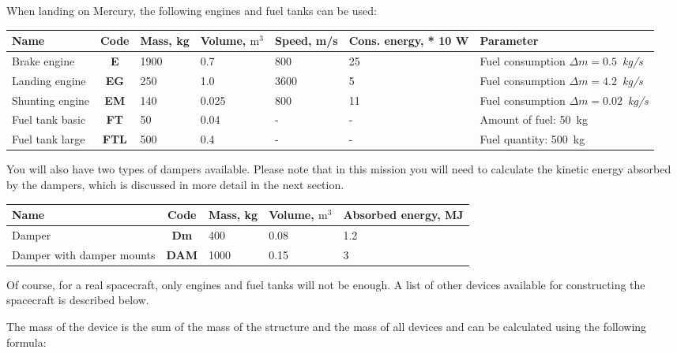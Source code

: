 \documentclass[12pt,a4paper]{article}
\begin{document}
When landing on Mercury, the following engines and fuel tanks can be used:

\begin{center}
\begin{tabular}{ |p{2.5cm}|c|p{1.5cm}|p{1.5cm}|p{2cm}|p{2cm}|p{2.5cm}| }
  \hline
  \textbf{Name} & \textbf{Code} & \textbf{Mass, kg} & \textbf{Volume, $\text{m}^3$} &
   \textbf{Speed, m/s} & \textbf{Cons. energy, * 10 W} & \textbf{Parameter}\\
   \hline
   Brake engine & \textbf{E} & 1900 & 0.7 & 800 & 25 & Fuel consumption $\Delta m =
   0.5$~\emph{kg/s}\\
   \hline
   Landing engine & \textbf{EG} & 250 & 1.0 & 3600 & 5 & Fuel consumption $\Delta m =
   4.2$~\emph{kg/s}\\
   \hline
   Shunting engine & \textbf{EM} & 140 & 0.025 & 800 & 11 & Fuel consumption $\Delta m =
   0.02$~\emph{kg/s}\\
   \hline
   Fuel tank basic & \textbf{FT} & 50 & 0.04 & - & - & Amount of fuel: 50~kg\\
   \hline
   Fuel tank large & \textbf{FTL} & 500 & 0.4 & - & - & Fuel quantity: 500~kg\\
   \hline
\end{tabular}
\end{center}

You will also have two types of dampers available. Please note that in this mission you will need to calculate the kinetic energy absorbed by the dampers, which is discussed in more detail in the next section.

\begin{center}
\begin{tabular}{ |p{5.5cm}|c|p{1.5cm}|p{1.5cm}|p{4cm}| }
  \hline
  \textbf{Name} & \textbf{Code} & \textbf{Mass, kg} & \textbf{Volume, $\text{m}^3$} &
   \textbf{Absorbed energy, MJ}\\
   \hline
   Damper & \textbf{Dm} & 400 & 0.08 & 1.2\\
   \hline
   Damper with damper mounts & \textbf{DAM} & 1000 & 0.15 & 3\\
   \hline
\end{tabular}
\end{center}

Of course, for a real spacecraft, only engines and fuel tanks will not be enough. A list of other devices available for constructing the spacecraft is described below.

The mass of the device is the sum of the mass of the structure and the mass of all devices and can be calculated using the following formula:
\end{document}
